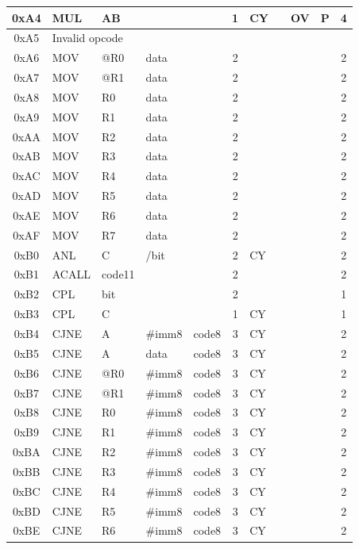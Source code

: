 \documentclass[a4paper,twoside,12pt]{book}
\begin{document}
{\begin{longtable}{|c|l|lll|c|llll|c|}
		0xA4	& MUL	& AB	&	&	& 1	& CY	&	& OV	& P	& 4	\\\hline
		0xA5	& \multicolumn{10}{l|}{Invalid opcode}						\\\hline
		0xA6	& MOV	& @R0	& data	&	& 2	&	&	&	&	& 2	\\\hline
		0xA7	& MOV	& @R1	& data	&	& 2	&	&	&	&	& 2	\\\hline
		0xA8	& MOV	& R0	& data	&	& 2	&	&	&	&	& 2	\\\hline
		0xA9	& MOV	& R1	& data	&	& 2	&	&	&	&	& 2	\\\hline
		0xAA	& MOV	& R2	& data	&	& 2	&	&	&	&	& 2	\\\hline
		0xAB	& MOV	& R3	& data	&	& 2	&	&	&	&	& 2	\\\hline
		0xAC	& MOV	& R4	& data	&	& 2	&	&	&	&	& 2	\\\hline
		0xAD	& MOV	& R5	& data	&	& 2	&	&	&	&	& 2	\\\hline
		0xAE	& MOV	& R6	& data	&	& 2	&	&	&	&	& 2	\\\hline
		0xAF	& MOV	& R7	& data	&	& 2	&	&	&	&	& 2	\\\hline
		0xB0	& ANL	& C	& /bit	&	& 2	& CY	&	&	&	& 2	\\\hline
		0xB1	& ACALL	& code11&	&	& 2	&	&	&	&	& 2	\\\hline
		0xB2	& CPL	& bit	&	&	& 2	&	&	&	&	& 1	\\\hline
		0xB3	& CPL	& C	&	&	& 1	& CY	&	&	&	& 1	\\\hline
		0xB4	& CJNE	& A	& \#imm8& code8	& 3	& CY	&	&	&	& 2	\\\hline
		0xB5	& CJNE	& A	& data	& code8	& 3	& CY	&	&	&	& 2	\\\hline
		0xB6	& CJNE	& @R0	& \#imm8& code8	& 3	& CY	&	&	&	& 2	\\\hline
		0xB7	& CJNE	& @R1	& \#imm8& code8	& 3	& CY	&	&	&	& 2	\\\hline
		0xB8	& CJNE	& R0	& \#imm8& code8	& 3	& CY	&	&	&	& 2	\\\hline
		0xB9	& CJNE	& R1	& \#imm8& code8	& 3	& CY	&	&	&	& 2	\\\hline
		0xBA	& CJNE	& R2	& \#imm8& code8	& 3	& CY	&	&	&	& 2	\\\hline
		0xBB	& CJNE	& R3	& \#imm8& code8	& 3	& CY	&	&	&	& 2	\\\hline
		0xBC	& CJNE	& R4	& \#imm8& code8	& 3	& CY	&	&	&	& 2	\\\hline
		0xBD	& CJNE	& R5	& \#imm8& code8	& 3	& CY	&	&	&	& 2	\\\hline
		0xBE	& CJNE	& R6	& \#imm8& code8	& 3	& CY	&	&	&	& 2	\\\hline

\end{longtable}}
\end{document}
